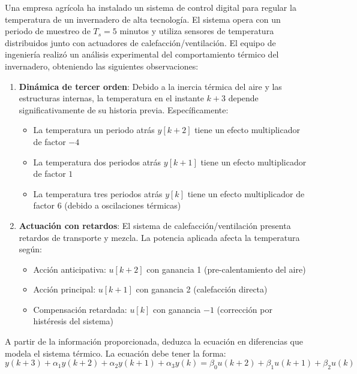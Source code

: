 \documentclass[
  11pt,
  letterpaper,
   addpoints,
   answers
  ]{exam}
\begin{document}
\begin{questions}
    \question Una empresa agrícola ha instalado un sistema de control digital para regular la temperatura de un invernadero de alta tecnología. El sistema opera con un periodo de muestreo de $T_s = 5$ minutos y utiliza sensores de temperatura distribuidos junto con actuadores de calefacción/ventilación. El equipo de ingeniería realizó un análisis experimental del comportamiento térmico del invernadero, obteniendo las siguientes observaciones:
    
    \begin{enumerate}
        \item \textbf{Dinámica de tercer orden}: Debido a la inercia térmica del aire y las estructuras internas, la temperatura en el instante $k+3$ depende significativamente de su historia previa. Específicamente:
        \begin{itemize}
            \item La temperatura un periodo atrás $y[k+2]$ tiene un efecto multiplicador de factor $-4$
            \item La temperatura dos periodos atrás $y[k+1]$ tiene un efecto multiplicador de factor $1$
            \item La temperatura tres periodos atrás $y[k]$ tiene un efecto multiplicador de factor $6$ (debido a oscilaciones térmicas)
        \end{itemize}
        
        \item \textbf{Actuación con retardos}: El sistema de calefacción/ventilación presenta retardos de transporte y mezcla. La potencia aplicada afecta la temperatura según:
        \begin{itemize}
            \item Acción anticipativa: $u[k+2]$ con ganancia 1 (pre-calentamiento del aire)
            \item Acción principal: $u[k+1]$ con ganancia 2 (calefacción directa)
            \item Compensación retardada: $u[k]$ con ganancia $-1$ (corrección por histéresis del sistema)
        \end{itemize}
    \end{enumerate}
    
    \vspace{0.2cm}
     A partir de la información proporcionada, deduzca la ecuación en diferencias que modela el sistema térmico. La ecuación debe tener la forma:
    \begin{equation*}
        y(k+3) + \alpha_1 y(k+2) + \alpha_2 y(k+1) + \alpha_3 y(k) = \beta_0 u(k+2) + \beta_1 u(k+1) + \beta_2 u(k)
    \end{equation*}
    

\end{questions}
\end{document}
